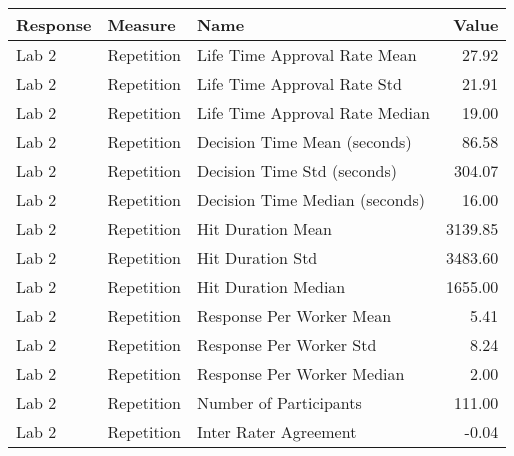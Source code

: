 \begin{tabular}{lllr}
\toprule
Response & Measure & Name & Value \\
\midrule
Lab 2 & Repetition & Life Time Approval Rate Mean & 27.92 \\
Lab 2 & Repetition & Life Time Approval Rate Std & 21.91 \\
Lab 2 & Repetition & Life Time Approval Rate Median & 19.00 \\
Lab 2 & Repetition & Decision Time Mean (seconds) & 86.58 \\
Lab 2 & Repetition & Decision Time Std (seconds) & 304.07 \\
Lab 2 & Repetition & Decision Time Median (seconds) & 16.00 \\
Lab 2 & Repetition & Hit Duration Mean & 3139.85 \\
Lab 2 & Repetition & Hit Duration Std & 3483.60 \\
Lab 2 & Repetition & Hit Duration Median & 1655.00 \\
Lab 2 & Repetition & Response Per Worker Mean & 5.41 \\
Lab 2 & Repetition & Response Per Worker Std & 8.24 \\
Lab 2 & Repetition & Response Per Worker Median & 2.00 \\
Lab 2 & Repetition & Number of Participants & 111.00 \\
Lab 2 & Repetition & Inter Rater Agreement & -0.04 \\
\bottomrule
\end{tabular}
